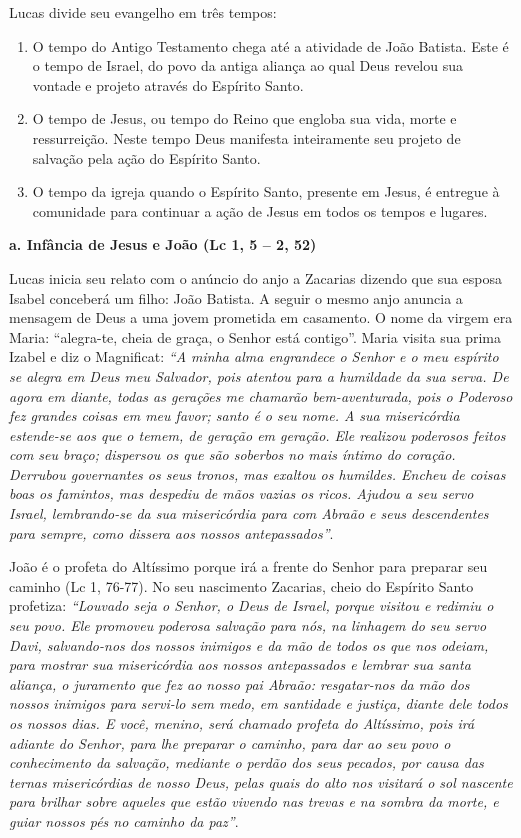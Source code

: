 \documentclass[
]{book}
\begin{document}
Lucas divide seu evangelho em três tempos:

\begin{enumerate}
\def\labelenumi{\arabic{enumi}.}
\item
  O tempo do Antigo Testamento chega até a atividade de João Batista. Este é o tempo de Israel, do povo da antiga aliança ao qual Deus revelou sua vontade e projeto através do Espírito Santo.
\item
  O tempo de Jesus, ou tempo do Reino que engloba sua vida, morte e ressurreição. Neste tempo Deus manifesta inteiramente seu projeto de salvação pela ação do Espírito Santo.
\item
  O tempo da igreja quando o Espírito Santo, presente em Jesus, é entregue à comunidade para continuar a ação de Jesus em todos os tempos e lugares.
\end{enumerate}

\textbf{a. Infância de Jesus e João (Lc 1, 5 -- 2, 52)}

Lucas inicia seu relato com o anúncio do anjo a Zacarias dizendo que sua esposa Isabel conceberá um filho: João Batista. A seguir o mesmo anjo anuncia a mensagem de Deus a uma jovem prometida em casamento. O nome da virgem era Maria: ``alegra-te, cheia de graça, o Senhor está contigo''. Maria visita sua prima Izabel e diz o Magnificat: \emph{``A minha alma engrandece o Senhor e o meu espírito se alegra em Deus meu Salvador, pois atentou para a humildade da sua serva. De agora em diante, todas as gerações me chamarão bem-aventurada, pois o Poderoso fez grandes coisas em meu favor; santo é o seu nome. A sua misericórdia estende-se aos que o temem, de geração em geração. Ele realizou poderosos feitos com seu braço; dispersou os que são soberbos no mais íntimo do coração. Derrubou governantes os seus tronos, mas exaltou os humildes. Encheu de coisas boas os famintos, mas despediu de mãos vazias os ricos. Ajudou a seu servo Israel, lembrando-se da sua misericórdia para com Abraão e seus descendentes para sempre, como dissera aos nossos antepassados''}.

João é o profeta do Altíssimo porque irá a frente do Senhor para preparar seu caminho (Lc 1, 76-77). No seu nascimento Zacarias, cheio do Espírito Santo profetiza: \emph{``Louvado seja o Senhor, o Deus de Israel, porque visitou e redimiu o seu povo. Ele promoveu poderosa salvação para nós, na linhagem do seu servo Davi, salvando-nos dos nossos inimigos e da mão de todos os que nos odeiam, para mostrar sua misericórdia aos nossos antepassados e lembrar sua santa aliança, o juramento que fez ao nosso pai Abraão: resgatar-nos da mão dos nossos inimigos para servi-lo sem medo, em santidade e justiça, diante dele todos os nossos dias. E você, menino, será chamado profeta do Altíssimo, pois irá adiante do Senhor, para lhe preparar o caminho, para dar ao seu povo o conhecimento da salvação, mediante o perdão dos seus pecados, por causa das ternas misericórdias de nosso Deus, pelas quais do alto nos visitará o sol nascente para brilhar sobre aqueles que estão vivendo nas trevas e na sombra da morte, e guiar nossos pés no caminho da paz''}.
\end{document}
